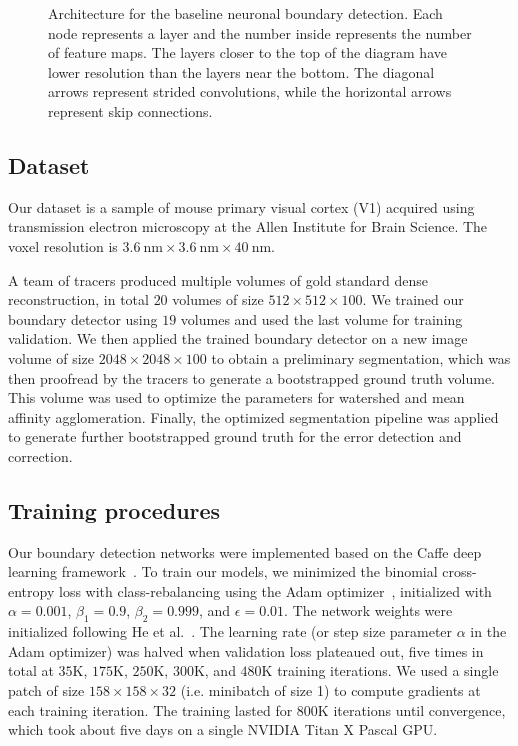 \documentclass{article}
\begin{document}
\begin{appendices}
\begin{figure}[!b]
\caption{Architecture for the baseline neuronal boundary detection. Each node represents a layer and the number inside represents the number of feature maps. The layers closer to the top of the diagram have lower resolution than the layers near the bottom. The diagonal arrows represent strided convolutions, while the horizontal arrows represent skip connections.}
\label{fig:boundary_detector}
\end{figure}

\subsection{Dataset}
Our dataset is a sample of mouse primary visual cortex (V1) acquired using
transmission electron microscopy at the Allen Institute for Brain Science. The
voxel resolution is $3.6~\text{nm} \times 3.6~\text{nm} \times 40~\text{nm}$.

A team of tracers produced multiple volumes of gold standard dense reconstruction, in total $20$ volumes of size $512 \times 512 \times 100$. We trained our boundary detector using $19$ volumes and used the last volume for training validation. We then applied the trained boundary detector on a new image volume of size $2048 \times 2048 \times 100$ to obtain a preliminary segmentation, which was then proofread by the tracers to generate a bootstrapped ground truth volume. This volume was used to optimize the parameters for watershed and mean affinity agglomeration. Finally, the optimized segmentation pipeline was applied to generate further bootstrapped ground truth for the error detection and correction.

\subsection{Training procedures}
Our boundary detection networks were implemented based on the Caffe deep
learning framework~\cite{jia2014caffe}. To train our models, we minimized the
binomial cross-entropy loss with class-rebalancing using the Adam
optimizer~\cite{adam}, initialized with $\alpha=0.001$, $\beta_1=0.9$,
$\beta_2=0.999$, and $\epsilon=0.01$. The network weights were initialized
following He et al.~\cite{he2015delving}. The learning rate (or step size
parameter $\alpha$ in the Adam optimizer) was halved when validation loss
plateaued out, five times in total at $35$K, $175$K, $250$K, $300$K, and
$480$K training iterations. We used a single patch of size
$158\times158\times32$ (i.e. minibatch of size 1) to compute gradients at each
training iteration. The training lasted for $800$K iterations until convergence,
which took about five days on a single NVIDIA Titan X Pascal GPU.


\end{appendices}
\end{document}
